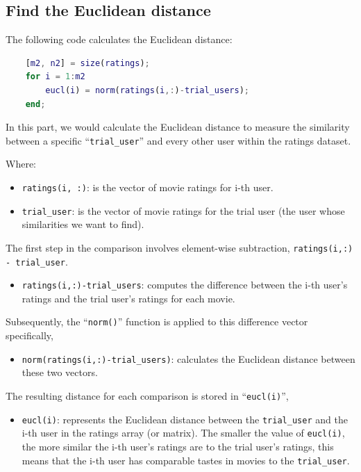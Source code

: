 \subsection{Find the Euclidean distance}

The following code calculates the Euclidean distance:

\begin{lstlisting}[style=StyleCode, language=MATLAB]
	% Find the Euclidean distance
	[m2, n2] = size(ratings);
	for i = 1:m2
		eucl(i) = norm(ratings(i,:)-trial_users);
	end;
\end{lstlisting}

In this part, we would calculate the Euclidean distance to measure the similarity between a specific “\texttt{trial\_user}” and every other user within the ratings dataset.

Where:

\begin{itemize}[label=-]
	\item \texttt{ratings(i, :)}: is the vector of movie ratings for i-th user.
	\item \texttt{trial\_user}: is the vector of movie ratings for the trial user (the user whose similarities we want to find).
\end{itemize}

The first step in the comparison involves element-wise subtraction, \texttt{ratings(i,:) - trial\_user}.

\begin{itemize}[label=-]
	\item \texttt{ratings(i,:)-trial\_users}: computes the difference between the i-th user's ratings and the trial user's ratings for each movie. 
\end{itemize}

Subsequently, the “\texttt{norm()}” function is applied to this difference vector specifically,

\begin{itemize}[label=-]
	\item \texttt{norm(ratings(i,:)-trial\_users)}: calculates the Euclidean distance between these two vectors.
\end{itemize}

The resulting distance for each comparison is stored in “\texttt{eucl(i)}”,

\begin{itemize}[label=-]
	\item \texttt{eucl(i)}: represents the Euclidean distance between the \texttt{trial\_user} and the i-th user in the ratings array (or matrix). The smaller the value of \texttt{eucl(i)}, the more similar the i-th user's ratings are to the trial user's ratings, this means that the i-th user has comparable tastes in movies to the \texttt{trial\_user}.
\end{itemize}

